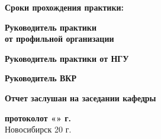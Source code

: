 \documentclass{article}
\begin{document}
\begin{titlepage}
	\noindent
	\hrulefill

	\noindent
	\textbf{Сроки прохождения практики:} \underline{\hspace{5cm}}

	\noindent
	\textbf{Руководитель практики}\\
	\noindent
	\textbf{от профильной организации} \quad\quad{}\qquad{}

	\noindent
	\textbf{Руководитель практики от НГУ}\; \qquad{}

	\noindent
	\textbf{Руководитель ВКР}\qquad\qquad\qquad\; \qquad{}

	\noindent
	\textbf{Отчет заслушан на заседании кафедры}\;

	\noindent
	\textbf{протокол\quad\longunder{1.5cm}\quad от \quad «\longunder{0.5cm}»
	\quad\longunder{4cm}\longunder{0.5cm} г.} \leavevmode\\

	{\centering Новосибирск 20\longunder{0.5cm} г. \\}
\end{titlepage}
\end{document}
